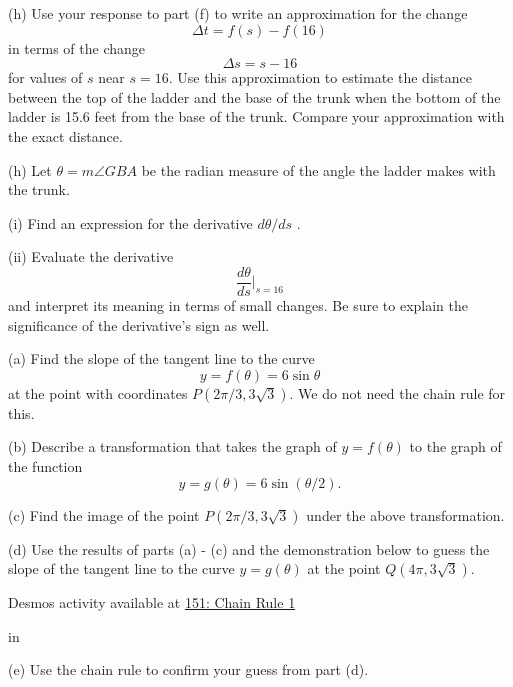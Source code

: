 \documentclass{ximera}
\newcommand{\pskip}{\vskip 0.1 in}
\begin{document}
\begin{question}
(h) Use your response to part (f) to write an approximation for the change
\[
         \Delta t = f(s) - f(16)
\]
in terms of the change 
\[
     \Delta s = s - 16
\]
for values of $s$ near $s=16$. Use this approximation to estimate the distance between the top of the ladder and the base of the trunk when the bottom of the ladder is 15.6 feet from the base of the trunk. Compare your approximation with the exact distance.

(h) Let $\theta = m\angle GBA$ be the radian measure of the angle the ladder makes with the trunk. 

(i) Find an expression for the derivative $d\theta/ds$ .

(ii) Evaluate the derivative 
\[
     \frac{d\theta}{ds}\Big|_{s=16}
\]
and interpret its meaning in terms of small changes. Be sure to explain the significance of the derivative's sign as well.

\end{question}


\begin{example}  \label{Ex:CHr34rrer}
(a) Find the slope of the tangent line to the curve
\[
   y = f(\theta) = 6 \sin \theta
\]
at the point with coordinates $P(2\pi/3, 3\sqrt{3})$. We do not need the chain rule for this.

(b) Describe a transformation that takes the graph of $y=f(\theta)$ to the graph of the function
\[
        y = g(\theta) = 6\sin (\theta/2) .
\]

(c) Find the image of the point $P(2\pi/3,3\sqrt{3})$ under the above transformation.

(d) Use the results of parts (a) - (c) and the demonstration below to guess the slope of the tangent line to the curve $y=g(\theta)$ at the point $Q(4\pi,3\sqrt{3})$.

\begin{onlineOnly}
    \begin{center}
\end{center}
\end{onlineOnly}

Desmos activity available at \href{https://www.desmos.com/calculator/mqjxpsqyo5}{151: Chain Rule 1}

\pskip

(e) Use the chain rule to confirm your guess from part (d).

\end{example}
\end{document}
